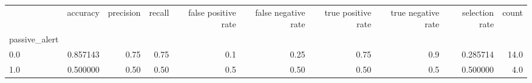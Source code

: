 \begin{tabular}{lrrrrrrrrr}
\toprule
{} &  accuracy &  precision &  recall &  false positive rate &  false negative rate &  true positive rate &  true negative rate &  selection rate &  count \\
passive\_alert &           &            &         &                      &                      &                     &                     &                 &        \\
\midrule
0.0           &  0.857143 &       0.75 &    0.75 &                  0.1 &                 0.25 &                0.75 &                 0.9 &        0.285714 &   14.0 \\
1.0           &  0.500000 &       0.50 &    0.50 &                  0.5 &                 0.50 &                0.50 &                 0.5 &        0.500000 &    4.0 \\
\bottomrule
\end{tabular}
